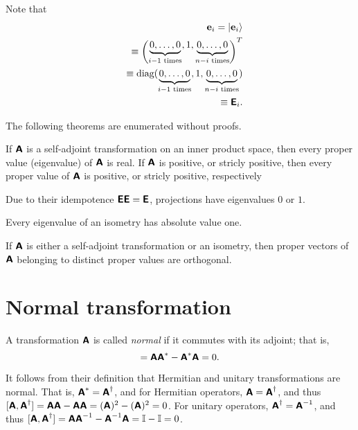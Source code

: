 {Note that
\begin{equation}
\begin{split}
{\bf e}_i=\vert {\bf e}_i \rangle  \\
\quad \equiv \begin{pmatrix} \underbrace{0,\ldots , 0}_{i-1 \textrm{ times}}, 1, \underbrace{0,\ldots , 0}_{n-i \textrm{ times}} \end{pmatrix}^T   \\
\quad \equiv  \textrm{diag}(  \underbrace{0,\ldots , 0}_{i-1 \textrm{ times}}, 1, \underbrace{0,\ldots , 0}_{n-i \textrm{ times}}  )
  \\
\quad \equiv  \textsf{\textbf{E}}_{i}.
\end{split}
\end{equation}
{\textrm{\eexample}}
}


The following theorems are enumerated without proofs.

If $\textsf{\textbf{A}}$
is a self-adjoint transformation on an inner product space, then every proper value (eigenvalue)  of $\textsf{\textbf{A}}$
is real.
If $\textsf{\textbf{A}}$ is positive, or stricly positive,
then every proper value of  $\textsf{\textbf{A}}$ is positive, or stricly positive, respectively

Due to their idempotence $\textsf{\textbf{E}}\textsf{\textbf{E}}=\textsf{\textbf{E}}$,
projections have eigenvalues $0$ or $1$.

Every eigenvalue of an isometry has absolute value one.

If  $\textsf{\textbf{A}}$  is either a self-adjoint transformation or an isometry,
then proper vectors of $ \textsf{\textbf{A}}$
belonging to distinct proper values are orthogonal.


\section{Normal transformation}
\label{2014-m-fdvs-normality}

A transformation $\textsf{\textbf{A}}$ is called {\em normal}
if it commutes with its adjoint; that is,
\begin{equation}
[\textsf{\textbf{A}},\textsf{\textbf{A}}^*]= \textsf{\textbf{A}}\textsf{\textbf{A}}^* -
\textsf{\textbf{A}}^* \textsf{\textbf{A}} =0.
\end{equation}


It follows from their definition that Hermitian and unitary transformations are normal. That is,
$\textsf{\textbf{A}}^\ast =\textsf{\textbf{A}}^\dagger$,
and for Hermitian operators,
$\textsf{\textbf{A}}=\textsf{\textbf{A}}^\dagger$,
and thus
$[\textsf{\textbf{A}},\textsf{\textbf{A}}^\dagger]= \textsf{\textbf{A}}\textsf{\textbf{A}} -
\textsf{\textbf{A}} \textsf{\textbf{A}} =(\textsf{\textbf{A}})^2 -(\textsf{\textbf{A}})^2=0$.
For unitary operators,
$\textsf{\textbf{A}}^\dagger =\textsf{\textbf{A}}^{-1}$,
and thus
$[\textsf{\textbf{A}},\textsf{\textbf{A}}^\dagger]= \textsf{\textbf{A}}\textsf{\textbf{A}}^{-1} -
\textsf{\textbf{A}}^{-1} \textsf{\textbf{A}} ={\Bbb I} -{\Bbb I} =0$.



